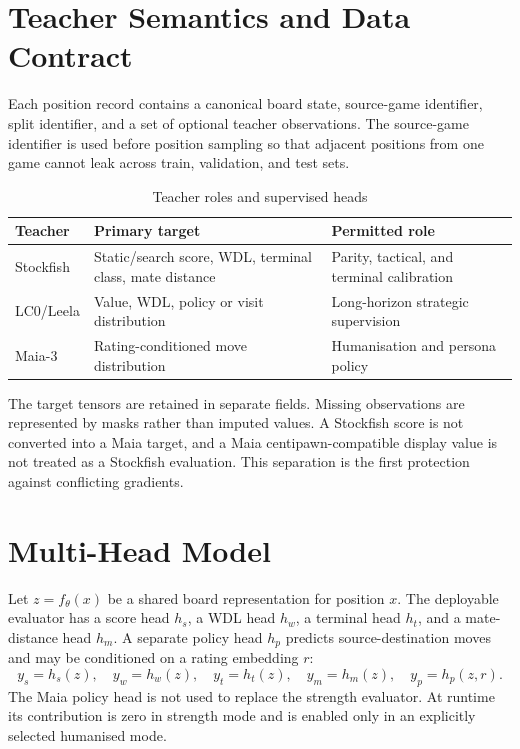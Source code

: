 \documentclass[conference]{IEEEtran}
\begin{document}
\section{Teacher Semantics and Data Contract}
Each position record contains a canonical board state, source-game identifier, split identifier, and a set of optional teacher observations. The source-game identifier is used before position sampling so that adjacent positions from one game cannot leak across train, validation, and test sets.

\begin{table}[t]
\centering
\caption{Teacher roles and supervised heads}
\label{tab:teachers}
\begin{tabular}{p{}p{}p{}}
\toprule
Teacher & Primary target & Permitted role\\
\midrule
Stockfish & Static/search score, WDL, terminal class, mate distance & Parity, tactical, and terminal calibration\\
LC0/Leela & Value, WDL, policy or visit distribution & Long-horizon strategic supervision\\
Maia-3 & Rating-conditioned move distribution & Humanisation and persona policy\\
\bottomrule
\end{tabular}
\end{table}

The target tensors are retained in separate fields. Missing observations are represented by masks rather than imputed values. A Stockfish score is not converted into a Maia target, and a Maia centipawn-compatible display value is not treated as a Stockfish evaluation. This separation is the first protection against conflicting gradients.

\section{Multi-Head Model}
Let $z=f_{\theta}(x)$ be a shared board representation for position $x$. The deployable evaluator has a score head $h_s$, a WDL head $h_w$, a terminal head $h_t$, and a mate-distance head $h_m$. A separate policy head $h_p$ predicts source-destination moves and may be conditioned on a rating embedding $r$:
\begin{equation}
 y_s=h_s(z),\quad y_w=h_w(z),\quad y_t=h_t(z),\quad y_m=h_m(z),\quad y_p=h_p(z,r).
\end{equation}
The Maia policy head is not used to replace the strength evaluator. At runtime its contribution is zero in strength mode and is enabled only in an explicitly selected humanised mode.
\end{document}
